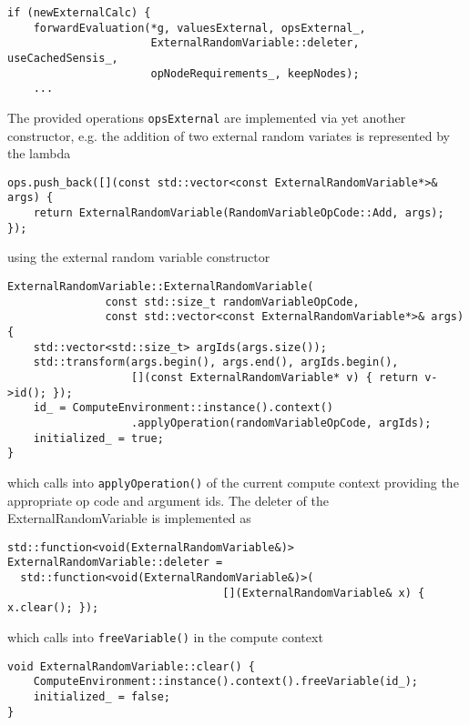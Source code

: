 \documentclass[12pt, a4paper]{article}
\begin{document}
\begin{verbatim}
if (newExternalCalc) {
    forwardEvaluation(*g, valuesExternal, opsExternal_,
                      ExternalRandomVariable::deleter, useCachedSensis_,
                      opNodeRequirements_, keepNodes);
    ...
\end{verbatim}

The provided operations \verb+opsExternal+ are implemented via yet another constructor, e.g. the addition of two
external random variates is represented by the lambda

\begin{verbatim}
ops.push_back([](const std::vector<const ExternalRandomVariable*>& args) {
    return ExternalRandomVariable(RandomVariableOpCode::Add, args);
});
\end{verbatim}

using the external random variable constructor

\begin{verbatim}
ExternalRandomVariable::ExternalRandomVariable(
               const std::size_t randomVariableOpCode,
               const std::vector<const ExternalRandomVariable*>& args) {
    std::vector<std::size_t> argIds(args.size());
    std::transform(args.begin(), args.end(), argIds.begin(),
                   [](const ExternalRandomVariable* v) { return v->id(); });
    id_ = ComputeEnvironment::instance().context()
                   .applyOperation(randomVariableOpCode, argIds);
    initialized_ = true;
}
\end{verbatim}

which calls into \verb+applyOperation()+ of the current compute context providing the appropriate op code and argument
ids. The deleter of the ExternalRandomVariable is implemented as

\begin{verbatim}
std::function<void(ExternalRandomVariable&)> ExternalRandomVariable::deleter =
  std::function<void(ExternalRandomVariable&)>(
                                 [](ExternalRandomVariable& x) { x.clear(); });
\end{verbatim}

which calls into \verb+freeVariable()+ in the compute context

\begin{verbatim}
void ExternalRandomVariable::clear() {
    ComputeEnvironment::instance().context().freeVariable(id_);
    initialized_ = false;
}
\end{verbatim}
\end{document}
